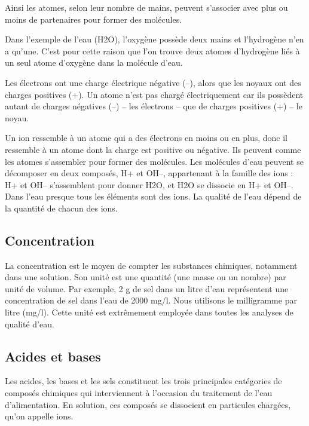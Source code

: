 Ainsi les atomes, selon leur nombre de mains, peuvent s’associer avec plus ou moins de partenaires pour former des molécules.
\vspace{0.3cm}

Dans l’exemple de l’eau (H2O), l’oxygène possède deux mains et l’hydrogène n’en a qu’une. C’est pour cette raison que l’on trouve deux atomes d’hydrogène liés à un seul atome d’oxygène dans la molécule d’eau.
\vspace{0.3cm}


Les électrons ont une charge électrique négative (–), alors que les noyaux ont des charges positives (+).
Un atome n’est pas chargé électriquement car ils possèdent autant de charges négatives (–) – les électrons – que de charges positives (+) – le noyau.
\vspace{0.3cm}

Un ion ressemble à un atome qui a des électrons en moins ou en plus, donc il ressemble à un atome dont la charge est positive ou négative. Ils peuvent comme les atomes s’assembler pour former des molécules.
Les molécules d’eau peuvent se décomposer en deux composés, H+ et OH–, appartenant à la famille des ions : H+ et OH– s’assemblent pour donner H2O, et H2O se dissocie en H+ et OH–.
Dans l’eau presque tous les éléments sont des ions.
La qualité de l’eau dépend de la quantité de chacun des ions.


\subsection{	Concentration}

La concentration est le moyen de compter les substances chimiques, notamment dans une solution.
Son unité est une quantité (une masse ou un nombre) par unité de volume. Par exemple, 2 g de sel dans un litre d’eau représentent une concentration de sel dans l’eau de 2000 mg/l.
Nous utilisons le milligramme par litre (mg/l). Cette unité est extrêmement employée dans toutes les analyses de qualité d’eau.



\subsection{	Acides et bases}

Les acides, les bases et les sels constituent les trois principales catégories de composés chimiques qui interviennent à l’occasion du traitement de l’eau d’alimentation. En solution, ces composés se dissocient en particules chargées, qu’on appelle ions.
\vspace{0.3cm}

